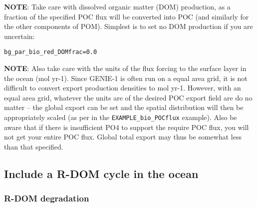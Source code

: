 \documentclass[10pt,twoside]{article}
\begin{document}
\begin{compactenum}
\noindent \textbf{NOTE}: Take care with dissolved organic matter (DOM) production, as a fraction of the specified POC flux will be converted into POC (and similarly for the other components of POM). Simplest is to set no DOM production if you are uncertain:
\vspace{-5pt}\begin{verbatim}bg_par_bio_red_DOMfrac=0.0\end{verbatim}\vspace{-5pt}
\noindent \textbf{NOTE}: Also take care with the units of the flux forcing to the surface layer in the ocean (mol yr-1). Since GENIE-1 is often run on a equal area grid, it is not difficult to convert export production densities to mol yr-1. However, with an equal area grid, whatever the units are of the desired POC export field are do no matter -- the global export can be set and the spatial distribution will then be appropriately scaled (as per in the \texttt{EXAMPLE\_bio\_POCflux} example). Also be aware that if there is insufficient PO4 to support the require POC flux, you will not get your entire POC flux. Global total export may thus be somewhat less than that specified.

\end{compactenum}




\subsection{Include a R-DOM cycle in the ocean}\label{Include a R-DOM cycle in the ocean}


\subsubsection{R-DOM degradation}\label{R-DOM degradation}
\end{document}
